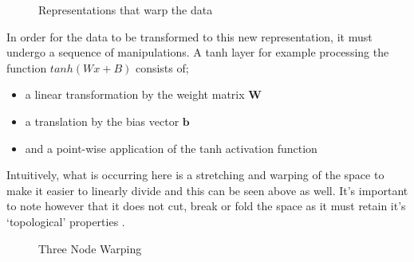 \documentclass[a4paper,11pt,titlepage]{article}
\begin{document}
		\begin{figure}[H]
    			\centering	
    			\qquad
    			\caption{Representations that warp the data}%
		\end{figure}		
		
		\par 
		In order for the data to be transformed to this new representation, it must undergo a sequence of manipulations. A tanh layer for example processing the function $ tanh(Wx + B) $ consists of; 
		\begin{itemize}
			\item a linear transformation by the weight matrix $ \bm{W} $
			\item a translation by the bias vector $ \bm{b} $
			\item and a point-wise application of the tanh activation function
		\end{itemize}
		Intuitively, what is occurring here is a stretching and warping of the space to make it easier to linearly divide and this can be seen above as well. It's important to note however that it does not cut, break or fold the space as it must retain it's `topological' properties \cite{Choi2005}.
		\par 
								
 		 \begin{figure}[H]
    			\caption{Three Node Warping}%
    			\label{fig:studentprofile}
		\end{figure}
		
\end{document}
